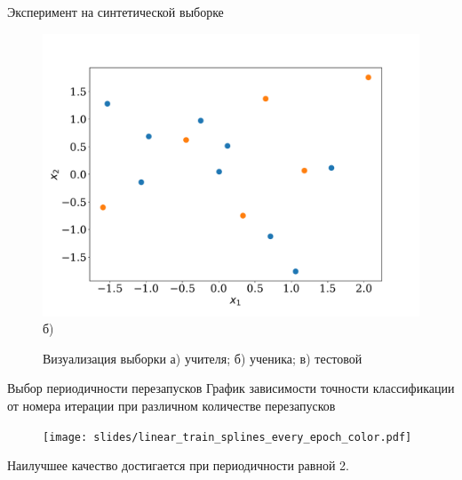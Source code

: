 \documentclass[10pt, aspectratio=169]{beamer}
\begin{document}
\begin{frame}{Эксперимент на синтетической выборке}
\begin{figure}
\begin{minipage}[h]{0.3\linewidth}
{    \includegraphics[width=\linewidth]{train.pdf}\\б)}
    \end{minipage}
    \begin{minipage}[h]{0.3\linewidth}
    \end{minipage}
    \vspace{-0.2 cm}
    \caption*{\fontsize{8}{5}\selectfont
    Визуализация выборки а) учителя; б) ученика; в) тестовой}
\end{figure}
\end{frame}

\begin{frame}{Выбор периодичности перезапусков}
График зависимости точности классификации от номера итерации при различном количестве перезапусков
\begin{figure}
    \texttt{[image: slides/linear\_train\_splines\_every\_epoch\_color.pdf]}
\end{figure}
    
Наилучшее качество достигается при периодичности равной 2.
\end{frame}
\end{document}
